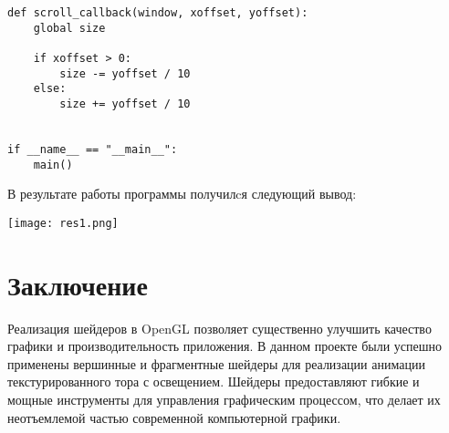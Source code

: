 \documentclass[a4paper, 14pt]{extarticle}
\begin{document}
\begin{lstlisting}
def scroll_callback(window, xoffset, yoffset):
    global size

    if xoffset > 0:
        size -= yoffset / 10
    else:
        size += yoffset / 10


if __name__ == "__main__":
    main()
\end{lstlisting}
\pagebreak
В результате работы программы получилcя следующий вывод:
\begin{center}
    \texttt{[image: res1.png]}
    \newpage
\end{center}
\pagebreak
\section{Заключение}
\par
Реализация шейдеров в OpenGL позволяет существенно улучшить качество графики и производительность приложения. В данном проекте были успешно применены вершинные и фрагментные шейдеры для реализации анимации текстурированного тора с освещением. Шейдеры предоставляют гибкие и мощные инструменты для управления графическим процессом, что делает их неотъемлемой частью современной компьютерной графики.
\end{document}

